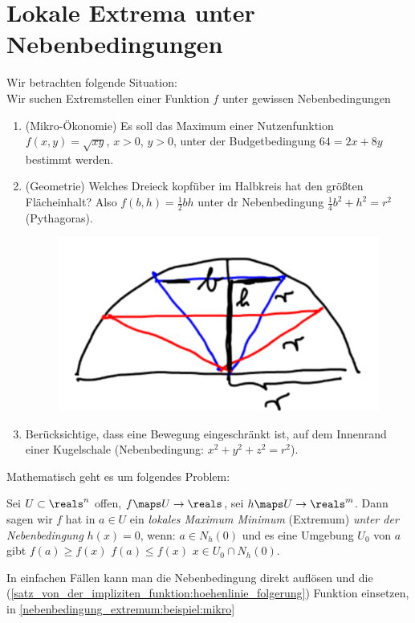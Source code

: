 \section{Lokale Extrema unter Nebenbedingungen}
Wir betrachten folgende Situation:\\
Wir suchen Extremstellen einer Funktion \( f \) unter gewissen Nebenbedingungen \zb 
\begin{enumerate}[label=\rechtsklammer{\alph*}]
  \item\label{nebenbedingung_extremum:beispiel:mikro} (Mikro-Ökonomie) Es soll das Maximum einer Nutzenfunktion \( f(x,y)=\sqrt{xy} \), \( x>0 \), \( y>0 \), unter der Budgetbedingung \( 64=2x+8y \) bestimmt werden.
  \item\label{nebenbedingung_extremum:beispiel:geometrie} (Geometrie) Welches Dreieck kopfüber im Halbkreis hat den größten Flächeinhalt? Also \( f(b,h)=\frac{1}{2}bh \) unter dr Nebenbedingung \( \frac{1}{4}b^2+h^2=r^2 \) (Pythagoras).
  \begin{figure}[H]
    \centering
    \includegraphics[width=0.4\linewidth]{figures/dreiecksmaximierung}
    \label{fig:dreiecksmaximierung}
  \end{figure}
  \item Berücksichtige, dass eine Bewegung eingeschränkt ist, \zb auf dem Innenrand einer Kugelschale (Nebenbedingung: \( x^2+y^2+z^2=r^2 \)).
\end{enumerate}
Mathematisch geht es um folgendes Problem:
\begin{definition}\label{nebenbedingung_extremum}
  Sei \( U\subset \reals^n \) offen, \( f\maps U\to \reals \), sei \( h\maps U\to \reals^m \). Dann sagen wir \( f \) hat in \( a\in U \) ein \emph{lokales Maximum \bzw Minimum} (Extremum) \emph{unter der Nebenbedingung} \( h(x)=0 \), wenn: \( a\in N_h(0) \) und es eine Umgebung \( U_0 \) von \( a \) gibt \sd \( f(a)\geq f(x) \) \bzw \( f(a)\leq f(x) \) \tforall \( x\in U_0 \cap N_h(0) \).
\end{definition}
In einfachen Fällen kann man die Nebenbedingung direkt auflösen und die (\ref{satz_von_der_impliziten_funktion:hoehenlinie_folgerung}) Funktion einsetzen, \zb in \ref{nebenbedingung_extremum:beispiel:mikro}
